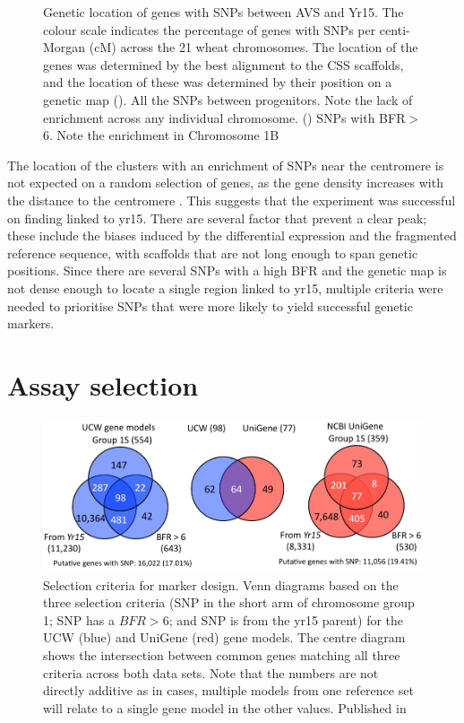 \begin{figure}
\begin{subfigure}{0.45\textwidth}
	\end{subfigure}
	\caption[Genetic location of genes with SNPs between AVS and Yr15.]{Genetic location of genes with SNPs between AVS and Yr15. The colour scale indicates the percentage of genes with SNPs per centi-Morgan (cM) across the 21 wheat chromosomes. The location of the genes was determined by the best alignment to the CSS scaffolds, and the location of these was determined by their position on a genetic map \citep{Wang2014} (). All the SNPs between progenitors. Note the lack of enrichment across any individual chromosome. () SNPs with BFR$>$6. Note the enrichment in Chromosome 1B }
	\label{fig:yr15:bfrs:0-6}
\end{figure}

The location of the clusters with an enrichment of SNPs near the centromere is not expected on a random selection of genes, as the gene density increases with the distance to the centromere \citep{Akhunov2003}. 
This suggests that the experiment was successful on finding  linked to \acrshort{yr15}. 
There are several factor that prevent a clear peak; these include the biases induced by the differential expression and the fragmented reference sequence, with scaffolds that are not long enough to span genetic positions. 
Since there are several SNPs with a high BFR and the genetic map is not dense enough to locate a single region linked to \acrshort{yr15},  multiple criteria were needed to prioritise SNPs that were more likely to yield successful genetic markers.

\section{Assay selection} 
\label{yr15:assaySelection}
\begin{figure}
\centering
\includegraphics[width=1\textwidth]{Yr15/Figures/selection/snpSets.pdf}
\caption[Selection criteria for marker design]{Selection criteria for marker design. Venn diagrams based on the three selection criteria (SNP in the short arm of chromosome group 1; SNP has a $BFR>6$; and SNP is from the \acrshort{yr15} parent) for the UCW (blue) and UniGene (red) gene models. The centre diagram shows the intersection between common genes matching all three criteria across both data sets. Note that the numbers are not directly additive as in cases, multiple models from one reference set will relate to a single gene model in the other values. Published in \citep{Ramirez-Gonzalez2015b} }
\label{fig:yr15:snpset}
\end{figure}

